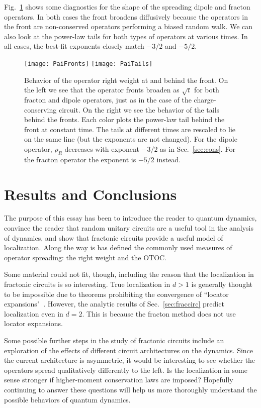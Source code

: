 \documentclass[a4paper,11pt]{article}
\begin{document}
Fig.~\ref{fig:PaiTails} shows some diagnostics for the shape of the spreading dipole and fracton operators. In both cases the front broadens diffusively because the operators in the front are non-conserved operators performing a biased random walk. We can also look at the power-law tails for both types of operators at various times. In all cases, the best-fit exponents closely match $-3/2$ and $-5/2$.
\begin{figure}
	\centering
	\texttt{[image: PaiFronts]}
	\texttt{[image: PaiTails]}
	\caption{Behavior of the operator right weight at and behind the front. 
		On the left we see that the operator fronts broaden as $\sqrt{t}$ for both fracton and dipole operators, just as in the case of the charge-conserving circuit.
		On the right we see the behavior of the tails behind the fronts. Each color plots the power-law tail behind the front at constant time. The tails at different times are rescaled to lie on the same line (but the exponents are not changed). For the dipole operator, $\rho_R$ decreases with exponent $-3/2$ as in Sec.~\ref{sec:cons}. For the fracton operator the exponent is $-5/2$ instead. }
	\label{fig:PaiTails}
\end{figure}


\section{Results and Conclusions} \label{sec:conc}

The purpose of this essay has been to introduce the reader to quantum dynamics, convince the reader that random unitary circuits are a useful tool in the analysis of dynamics, and show that fractonic circuits provide a useful model of localization. Along the way is has defined the commonly used measures of operator spreading: the right weight and the OTOC.

Some material could not fit, though, including the reason that the localization in fractonic circuits is so interesting. True localization in $d>1$ is generally thought to be impossible due to theorems prohibiting the convergence of ``locator expansions"~\cite{PaiFracton}. However, the analytic results of Sec.~\ref{sec:fraccirc} predict localization even in $d=2$. This is because the fracton method does not use locator expansions.

Some possible further steps in the study of fractonic circuits include an exploration of the effects of different circuit architectures on the dynamics. Since the current architecture is asymmetric, it would be interesting to see whether the operators spread qualitatively differently to the left. Is the localization in some sense stronger if higher-moment conservation laws are imposed? Hopefully continuing to answer these questions will help us more thoroughly understand the possible behaviors of quantum dynamics.


\nocite{apsrev41Control}

\end{document}
